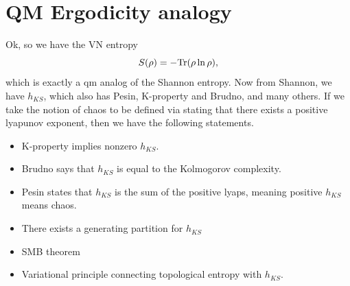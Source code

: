 \documentclass{article}
\begin{document}
\section{QM Ergodicity analogy}
Ok, so we have the VN entropy
\[
    S(\rho) = -\text{Tr}(\rho\ln \rho),
\]
which is exactly a qm analog of the Shannon entropy. Now from Shannon, we have $h_{KS}$, which also has Pesin, K-property and Brudno, and many others. If we take the notion of chaos to be defined via stating that there exists a positive lyapunov exponent, then we have the following statements.\\
\begin{itemize}
    \item K-property implies nonzero $h_{KS}$. 
    \item Brudno says that $h_{KS}$ is equal to the Kolmogorov complexity.  
    \item Pesin states that $h_{KS}$ is the sum of the positive lyaps, meaning positive $h_{KS}$ means chaos. 
    \item There exists a generating partition for $h_{KS}$
    \item SMB theorem 
    \item Variational principle connecting topological entropy with $h_{KS}$. 
    
\end{itemize}
\end{document}
